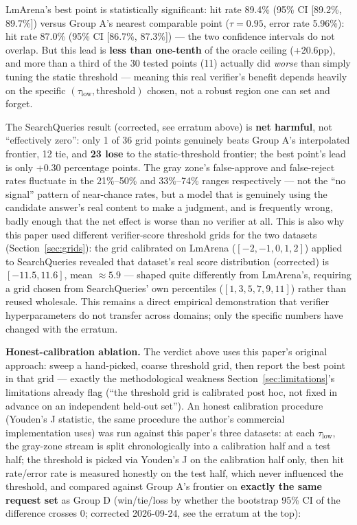 \documentclass[11pt]{article}
\newcommand{\taulow}{\ensuremath{\tau_{\text{low}}}}
\begin{document}
LmArena's best point is statistically significant: hit rate 89.4\% (95\% CI [89.2\%, 89.7\%]) versus Group A's nearest comparable point ($\tau=0.95$, error rate 5.96\%): hit rate 87.0\% (95\% CI [86.7\%, 87.3\%]) --- the two confidence intervals do not overlap. But this lead is \textbf{less than one-tenth} of the oracle ceiling (+20.6pp), and more than a third of the 30 tested points (11) actually did \emph{worse} than simply tuning the static threshold --- meaning this real verifier's benefit depends heavily on the specific $(\taulow, \text{threshold})$ chosen, not a robust region one can set and forget.

The SearchQueries result (corrected, see erratum above) is \textbf{net harmful}, not ``effectively zero'': only 1 of 36 grid points genuinely beats Group A's interpolated frontier, 12 tie, and \textbf{23 lose} to the static-threshold frontier; the best point's lead is only +0.30 percentage points. The gray zone's false-approve and false-reject rates fluctuate in the 21\%--50\% and 33\%--74\% ranges respectively --- not the ``no signal'' pattern of near-chance rates, but a model that is genuinely using the candidate answer's real content to make a judgment, and is frequently wrong, badly enough that the net effect is worse than no verifier at all. This is also why this paper used different verifier-score threshold grids for the two datasets (Section~\ref{sec:grids}): the grid calibrated on LmArena ($[-2,-1,0,1,2]$) applied to SearchQueries revealed that dataset's real score distribution (corrected) is $[-11.5, 11.6]$, mean $\approx 5.9$ --- shaped quite differently from LmArena's, requiring a grid chosen from SearchQueries' own percentiles ($[1,3,5,7,9,11]$) rather than reused wholesale. This remains a direct empirical demonstration that verifier hyperparameters do not transfer across domains; only the specific numbers have changed with the erratum.

\textbf{Honest-calibration ablation.} The verdict above uses this paper's original approach: sweep a hand-picked, coarse threshold grid, then report the best point in that grid --- exactly the methodological weakness Section~\ref{sec:limitations}'s limitations already flag (``the threshold grid is calibrated post hoc, not fixed in advance on an independent held-out set''). An honest calibration procedure (Youden's J statistic, the same procedure the author's commercial implementation uses) was run against this paper's three datasets: at each $\taulow$, the gray-zone stream is split chronologically into a calibration half and a test half; the threshold is picked via Youden's J on the calibration half only, then hit rate/error rate is measured honestly on the test half, which never influenced the threshold, and compared against Group A's frontier on \textbf{exactly the same request set} as Group D (win/tie/loss by whether the bootstrap 95\% CI of the difference crosses 0; corrected 2026-09-24, see the erratum at the top):
\end{document}
